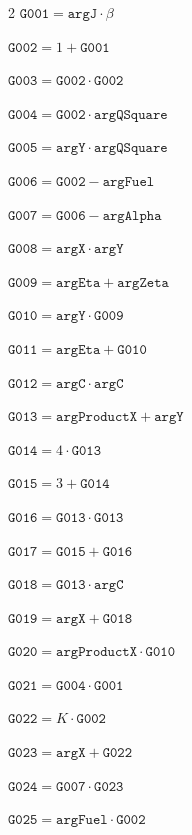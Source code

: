\documentclass[10pt]{article}
\begin{document}
\begin{multicols}{2}\fontsize{8}{9}\selectfont
\noindent $\mathtt{G001}=\mathtt{argJ}\cdot \beta$\par
\noindent $\mathtt{G002}=1+\mathtt{G001}$\par
\noindent $\mathtt{G003}=\mathtt{G002}\cdot \mathtt{G002}$\par
\noindent $\mathtt{G004}=\mathtt{G002}\cdot \mathtt{argQSquare}$\par
\noindent $\mathtt{G005}=\mathtt{argY}\cdot \mathtt{argQSquare}$\par
\noindent $\mathtt{G006}=\mathtt{G002}-\mathtt{argFuel}$\par
\noindent $\mathtt{G007}=\mathtt{G006}-\mathtt{argAlpha}$\par
\noindent $\mathtt{G008}=\mathtt{argX}\cdot \mathtt{argY}$\par
\noindent $\mathtt{G009}=\mathtt{argEta}+\mathtt{argZeta}$\par
\noindent $\mathtt{G010}=\mathtt{argY}\cdot \mathtt{G009}$\par
\noindent $\mathtt{G011}=\mathtt{argEta}+\mathtt{G010}$\par
\noindent $\mathtt{G012}=\mathtt{argC}\cdot \mathtt{argC}$\par
\noindent $\mathtt{G013}=\mathtt{argProductX}+\mathtt{argY}$\par
\noindent $\mathtt{G014}=4\cdot \mathtt{G013}$\par
\noindent $\mathtt{G015}=3+\mathtt{G014}$\par
\noindent $\mathtt{G016}=\mathtt{G013}\cdot \mathtt{G013}$\par
\noindent $\mathtt{G017}=\mathtt{G015}+\mathtt{G016}$\par
\noindent $\mathtt{G018}=\mathtt{G013}\cdot \mathtt{argC}$\par
\noindent $\mathtt{G019}=\mathtt{argX}+\mathtt{G018}$\par
\noindent $\mathtt{G020}=\mathtt{argProductX}\cdot \mathtt{G010}$\par
\noindent $\mathtt{G021}=\mathtt{G004}\cdot \mathtt{G001}$\par
\noindent $\mathtt{G022}=K\cdot \mathtt{G002}$\par
\noindent $\mathtt{G023}=\mathtt{argX}+\mathtt{G022}$\par
\noindent $\mathtt{G024}=\mathtt{G007}\cdot \mathtt{G023}$\par
\noindent $\mathtt{G025}=\mathtt{argFuel}\cdot \mathtt{G002}$\par

\end{multicols}
\end{document}
